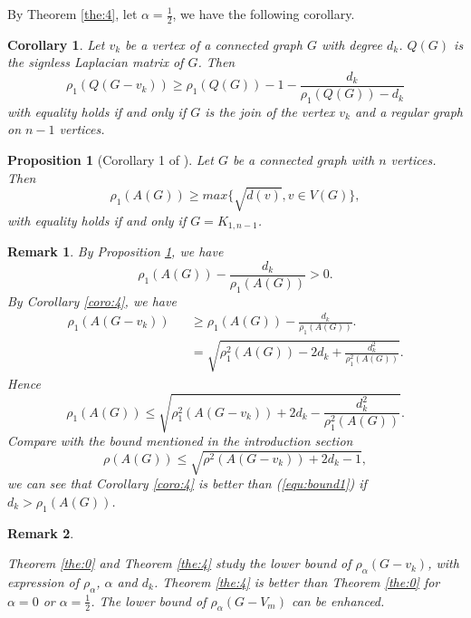 \documentclass[amsthm]{elsart}
\newtheorem{corollary}{Corollary}[section]
\newtheorem{proposition}{Proposition}[section]
\newtheorem{remark}{Remark}[section]
\begin{document}
By Theorem \ref{the:4}, let $\alpha = \frac{1}{2}$, we have the following corollary.
\begin{corollary} \label{coro:5}
Let $v_k$ be a vertex of a connected graph $G$ with degree $d_k$. $Q(G)$  is the signless Laplacian matrix of $G$. Then
\begin{equation} \label{equ:coro5}
\rho _1 (Q(G - v_k))
  \geqslant \rho _1(Q(G)) - 1 - \frac{d_k}{\rho _1(Q(G)) - d_k}
\end{equation}
with equality holds if and only if $G$ is the join of the vertex $v_k$ and a regular graph on $n-1$ vertices.
\end{corollary}


\begin{proposition} [Corollary 1 of \cite{2019Sharp}] \label{prop:remark1}
Let $G$ be a connected graph with $n$ vertices. Then
$$ \rho_1(A(G)) \geqslant max \{ \sqrt{d(v)},  v \in V(G)  \}, $$
with equality holds if and only if $G = K_{1,n-1}$.
\end{proposition}

\begin{remark} \label{remark:1}
By Proposition \ref{prop:remark1}, we have
\begin{equation*}
\rho _1(A(G)) - \frac{d_k}{\rho _1(A(G))} > 0.
\end{equation*}
By Corollary \ref{coro:4}, we have
\begin{eqnarray*}
\rho _1 (A(G - v_k))
&& \geqslant \rho _1(A(G)) - \frac{d_k}{\rho _1(A(G))}.
\\ && = \sqrt{\rho _1^2(A(G)) - 2d_k + \frac{d_k^2}{\rho _1^2(A(G))}}.
\end{eqnarray*}
Hence
\begin{equation*}
\rho _1(A(G)) \leqslant \sqrt{\rho _1^2 (A(G - v_k)) + 2 d_k - \frac{d_k^2}{\rho _1^2(A(G))}}.
\end{equation*}
 Compare with the bound \cite{2019A} mentioned in the introduction section
 \begin{equation} \label{equ:bound1}
 \rho(A(G)) \leqslant \sqrt{\rho^2(A(G - v_k)) + 2 d_k - 1},
 \end{equation}
 we can see that Corollary \ref{coro:4} is better than (\ref{equ:bound1}) if $ d_k > \rho _1(A(G))$.
\end{remark}


\begin{remark} \label{remark:2}

Theorem \ref{the:0} and Theorem \ref{the:4} study the lower bound of $\rho_\alpha(G-v_k)$, with expression of $\rho_\alpha$, $\alpha$ and $d_k$. Theorem \ref{the:4} is better than Theorem \ref{the:0} for $\alpha = 0$ or $\alpha = \frac{1}{2}$. The lower bound of $\rho_\alpha(G-V_m)$ can be enhanced.
\end{remark}
\end{document}

